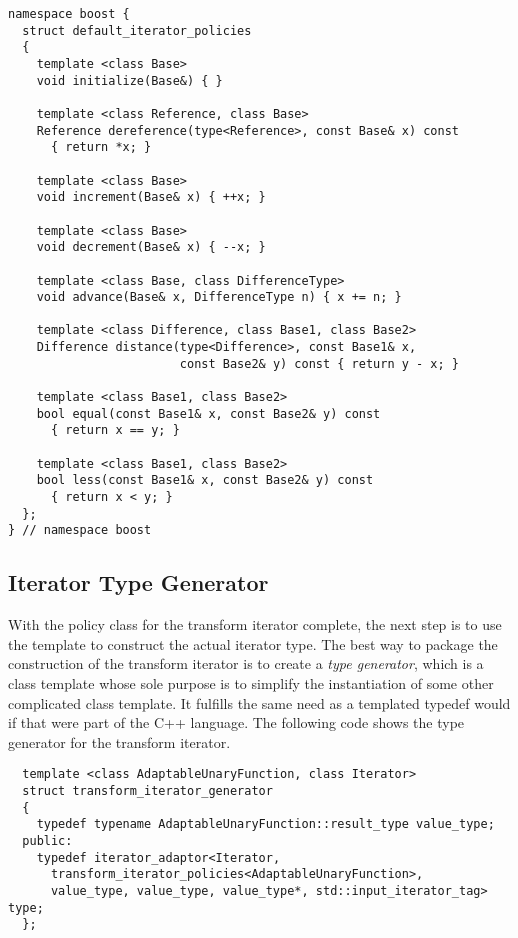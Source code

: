 \documentclass{netobjectdays}
\begin{document}
{\footnotesize
\begin{verbatim}
namespace boost {
  struct default_iterator_policies
  {
    template <class Base>
    void initialize(Base&) { }

    template <class Reference, class Base>
    Reference dereference(type<Reference>, const Base& x) const
      { return *x; }

    template <class Base>
    void increment(Base& x) { ++x; }

    template <class Base>
    void decrement(Base& x) { --x; }

    template <class Base, class DifferenceType>
    void advance(Base& x, DifferenceType n) { x += n; }

    template <class Difference, class Base1, class Base2>
    Difference distance(type<Difference>, const Base1& x,
                        const Base2& y) const { return y - x; }

    template <class Base1, class Base2>
    bool equal(const Base1& x, const Base2& y) const
      { return x == y; }

    template <class Base1, class Base2>
    bool less(const Base1& x, const Base2& y) const
      { return x < y; }
  };
} // namespace boost
\end{verbatim}
}


\subsection{Iterator Type Generator}
\label{sec:iter-type-generator}

With the policy class for the transform iterator complete, the next
step is to use the  template to construct the
actual iterator type. The best way to package the construction of the
transform iterator is to create a \emph{type generator}, which is a
class template whose sole purpose is to simplify the instantiation of
some other complicated class template. It fulfills the same need as a
templated typedef would if that were part of the {C++} language.
The following code shows the type generator for the transform
iterator.

{\footnotesize
\begin{verbatim}
  template <class AdaptableUnaryFunction, class Iterator>
  struct transform_iterator_generator
  {
    typedef typename AdaptableUnaryFunction::result_type value_type;
  public:
    typedef iterator_adaptor<Iterator, 
      transform_iterator_policies<AdaptableUnaryFunction>,
      value_type, value_type, value_type*, std::input_iterator_tag> type;
  };
\end{verbatim}
}
\end{document}
